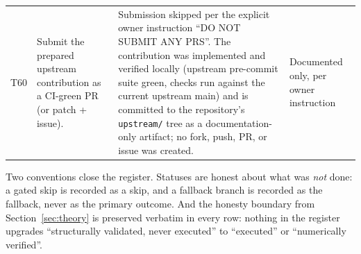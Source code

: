 {\begin{longtable}{@{}p{0.9cm}p{3.5cm}p{8.4cm}p{2.0cm}@{}}
T60
& Submit the prepared upstream contribution as a CI-green PR (or patch + issue).
& Submission skipped per the explicit owner instruction ``DO NOT SUBMIT ANY PRS''.
  The contribution was implemented and verified locally (upstream pre-commit suite
  green, checks run against the current upstream main) and is committed to the
  repository's \texttt{upstream/} tree as a documentation-only artifact; no fork,
  push, PR, or issue was created.
& Documented only, per owner instruction \\

\end{longtable}
}

Two conventions close the register. Statuses are honest about what was \emph{not}
done: a gated skip is recorded as a skip, and a fallback branch is recorded as the
fallback, never as the primary outcome. And the honesty boundary from
Section~\ref{sec:theory} is preserved verbatim in every row: nothing in the
register upgrades ``structurally validated, never executed'' to ``executed'' or
``numerically verified''.
